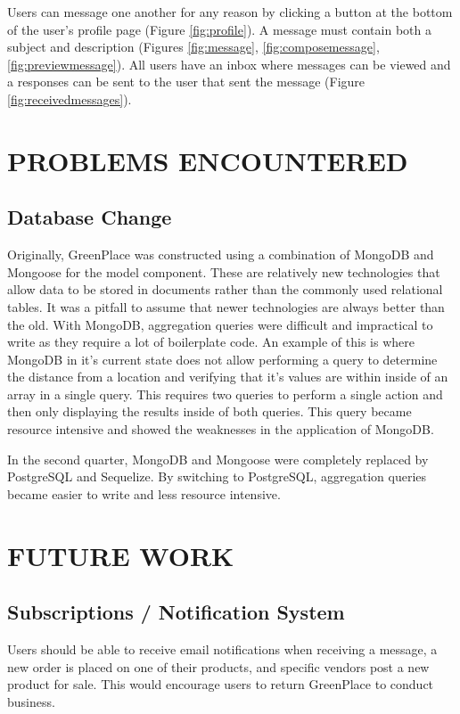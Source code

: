 \documentclass[letterpaper, 10 pt, conference]{ieeeconf}  %
\begin{document}
Users can message one another for any reason by clicking a button at the bottom of the user's profile page (Figure \ref{fig:profile}). A message must contain both a subject and description (Figures \ref{fig:message}, \ref{fig:composemessage}, \ref{fig:previewmessage}). All users have an inbox where messages can be viewed and a responses can be sent to the user that sent the message (Figure \ref{fig:receivedmessages}).

\section{PROBLEMS ENCOUNTERED}

\subsection{Database Change}
Originally, GreenPlace was constructed using a combination of MongoDB and Mongoose for the model component. These are relatively new technologies that allow data to be stored in documents rather than the commonly used relational tables. It was a pitfall to assume that newer technologies are always better than the old. With MongoDB, aggregation queries were difficult and impractical to write as they require a lot of boilerplate code. An example of this is where MongoDB in it's current state does not allow performing a query to determine the distance from a location and verifying that it's values are within inside of an array in a single query. This requires two queries to perform a single action and then only displaying the results inside of both queries. This query became resource intensive and showed the weaknesses in the application of MongoDB.

In the second quarter, MongoDB and Mongoose were completely replaced by PostgreSQL and Sequelize. By switching to PostgreSQL, aggregation queries became easier to write and less resource intensive.

\section{FUTURE WORK}

\subsection{Subscriptions / Notification System}
Users should be able to receive email notifications when receiving a message, a new order is placed on one of their products, and specific vendors post a new product for sale. This would encourage users to return GreenPlace to conduct business. 
\end{document}
